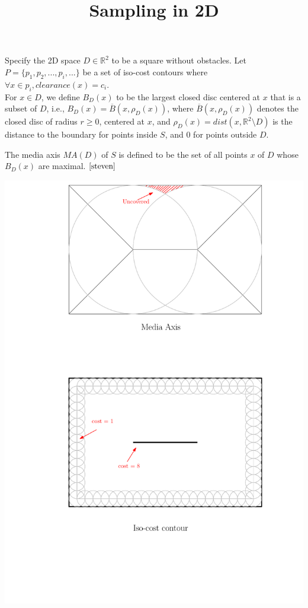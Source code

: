 \documentclass[12pt]{article}
\title{Sampling in 2D}
\date{}
\begin{document}
  \maketitle
  
  Specify the 2D space $D \in \mathbb{R}^2$ to be a square without obstacles. Let $P = \{ p_1, p_2, ..., p_i, ... \}$ be a set of iso-cost contours where $\forall x \in p_i, clearance(x) = c_i$. \\
  
  For $x\in D$, we define $B_D(x)$ to be the largest closed disc centered at $x$ that is a subset of $D$, i.e., $B_D(x) = \overline{B}( x, \rho_{D}(x) )$, where $\overline{B}( x, \rho_{D}(x) )$ denotes the closed disc of radius $r \geq 0$, centered at $x$, and $\rho_{D}(x) = dist(x, \mathbb{R}^2 \setminus D)$ is the distance to the boundary for points inside $S$, and 0 for points outside $D$.
  
  The media axis $MA(D)$ of $S$ is defined to be the set of all points $x$ of $D$ whose $B_D(x)$ are maximal. $\cite{steven}$
  
  
  
  \includegraphics[scale=0.8]{./sampling2d/1.pdf}
  
\end{document}
